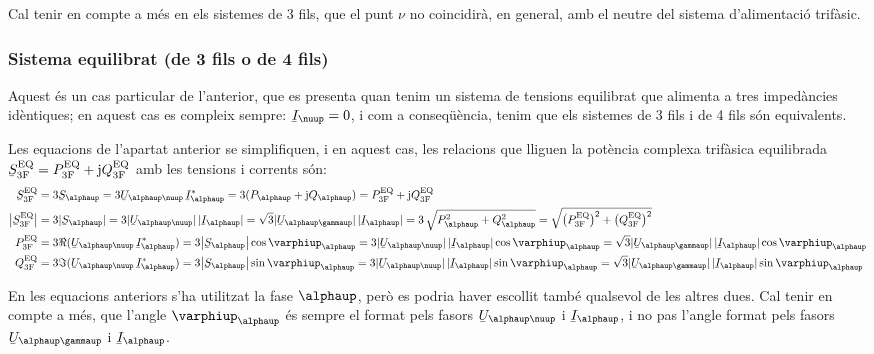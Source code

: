 Cal tenir en compte a m\'{e}s en els sistemes de 3 fils, que el punt
$\nu$ no coincidir\`{a}, en general, amb el neutre del sistema
d'alimentaci\'{o} trif\`{a}sic.

\subsubsection{Sistema equilibrat (de 3 fils o de 4 fils)}

Aquest \'{e}s un cas particular de l'anterior, que es presenta quan
tenim un sistema de tensions equilibrat que alimenta a tres
imped\`{a}ncies id\`{e}ntiques; en aquest cas es compleix sempre:
$\cmplx{I}_\nuup=0$, i com a conseq\"{u}\`{e}ncia, tenim que els sistemes de 3
fils i de 4 fils s\'{o}n equivalents.

Les equacions de l'apartat anterior se simplifiquen, i en aquest
cas, les relacions que lliguen la  pot\`{e}ncia complexa trif\`{a}sica
equilibrada $\cmplx{S}\ped{3F}\ap{EQ} = P\ped{3F}\ap{EQ} + \ju
Q\ped{3F}\ap{EQ}$ amb les tensions i corrents s\'{o}n:
\begin{align}
    \cmplx{S}\ped{3F}\ap{EQ} &= 3\cmplx{S}_\alphaup = 3\cmplx{U}_{\alphaup\nuup}\, \cmplx{I}_\alphaup^* =
    3 (P_\alphaup + \ju Q_\alphaup) = P\ped{3F}\ap{EQ} +\ju Q\ped{3F}\ap{EQ} \label{eq:s_3f_eq}\\
    \big|\cmplx{S}\ped{3F}\ap{EQ}\big| &= 3|\cmplx{S}_\alphaup | =   3 |\cmplx{U}_{\alphaup\nuup}| \,|\cmplx{I}_\alphaup| =
    \sqrt{3} |\cmplx{U}_{\alphaup\gammaup}|\, |\cmplx{I}_\alphaup| = 3\,\sqrt{P_\alphaup^2 + Q_\alphaup^2} =
    \sqrt{\big(P\ped{3F}\ap{EQ}\big)^2 + \big(Q\ped{3F}\ap{EQ}\big)^2} \\
    P\ped{3F}\ap{EQ} &= 3\Re(\cmplx{U}_{\alphaup\nuup} \,\cmplx{I}_\alphaup^*) =
    3\big|\cmplx{S}_\alphaup\big| \cos \varphiup_\alphaup = 3 |\cmplx{U}_{\alphaup\nuup}|\,
    |\cmplx{I}_\alphaup|\label{eq:p_3f_34}
    \cos \varphiup_\alphaup = \sqrt{3} |\cmplx{U}_{\alphaup\gammaup}|\,|\cmplx{I}_\alphaup| \cos \varphiup_\alphaup \\
    Q\ped{3F}\ap{EQ} &= 3\Im(\cmplx{U}_{\alphaup\nuup}\, \cmplx{I}_\alphaup^*) =
    3\big|\cmplx{S}_\alphaup\big|  \sin \varphiup_\alphaup = 3 |\cmplx{U}_{\alphaup\nuup}| \, |\cmplx{I}_\alphaup|\label{eq:q_3f_34}
    \sin\varphiup_\alphaup=\sqrt{3} |\cmplx{U}_{\alphaup\gammaup}|\,|\cmplx{I}_\alphaup|\sin \varphiup_\alphaup
\end{align}

En les equacions anteriors s'ha utilitzat la fase $\alphaup$, per\`{o} es
podria haver escollit tamb\'{e} qualsevol de les altres dues. Cal tenir
en compte a m\'{e}s, que l'angle $\varphiup_\alphaup$ \'{e}s sempre el format
pels fasors $\cmplx{U}_{\alphaup\nuup}$ i $\cmplx{I}_\alphaup$, i no pas
l'angle format pels fasors $\cmplx{U}_{\alphaup\gammaup}$ i
$\cmplx{I}_\alphaup$.

